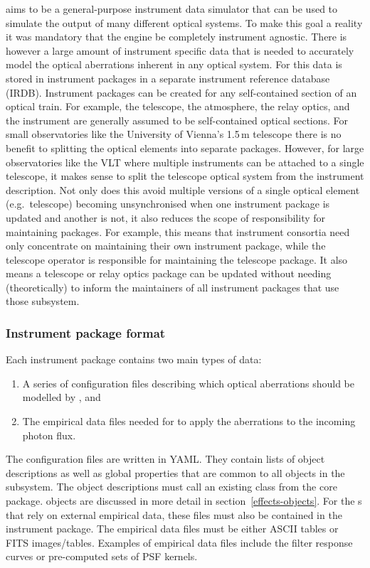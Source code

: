 \ScopeSim{} aims to be a general-purpose instrument data simulator that can be used to simulate the output of many different optical systems.
To make this goal a reality it was mandatory that the \scopesim{} engine be completely instrument agnostic.
There is however a large amount of instrument specific data that is needed to accurately model the optical aberrations inherent in any optical system.
For \ScopeSim{} this data is stored in instrument packages in a separate instrument reference database (IRDB).
Instrument packages can be created for any self-contained section of an optical train.
For example, the telescope, the atmosphere, the relay optics, and the instrument are generally assumed to be self-contained optical sections.
For small observatories like the University of Vienna's 1.5\,m telescope there is no benefit to splitting the optical elements into separate packages.
However, for large observatories like the VLT where multiple instruments can be attached to a single telescope, it makes sense to split the telescope optical system from the instrument description.
Not only does this avoid multiple versions of a single optical element (e.g.~telescope) becoming unsynchronised when one instrument package is updated and another is not, it also reduces the scope of responsibility for maintaining packages.
For example, this means that instrument consortia need only concentrate on maintaining their own instrument package, while the telescope operator is responsible for maintaining the telescope package.
It also means a telescope or relay optics package can be updated without needing (theoretically) to inform the maintainers of all instrument packages that use those subsystem.


\subsubsection{Instrument package format}
\label{instrument-package-format}

Each instrument package contains two main types of data:
\begin{enumerate}
\item A series of configuration files describing which optical aberrations should be modelled by \scopesim{}, and

\item The empirical data files needed for \scopesim{} to apply the aberrations to the incoming photon flux.
\end{enumerate}

The configuration files are written in YAML.
They contain lists of \Effect{} object descriptions as well as global properties that are common to all \Effect{} objects in the subsystem.
The \Effect{} object descriptions must call an existing \Effect{} class from the \ScopeSim{} core package.
\Effect{} objects are discussed in more detail in section~\ref{effects-objects}.
For the \Effect{}s that rely on external empirical data, these files must also be contained in the instrument package.
The empirical data files must be either ASCII tables or FITS images/tables.
Examples of empirical data files include the filter response curves or pre-computed sets of PSF kernels.

